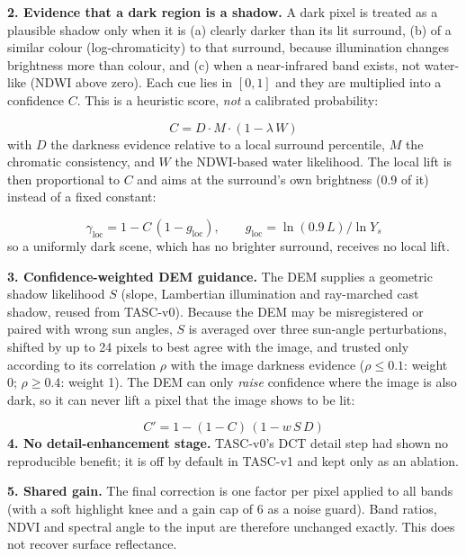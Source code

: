 \documentclass[conference]{IEEEtran}
\begin{document}
\textbf{2. Evidence that a dark region is a shadow.} A dark pixel is treated as a plausible shadow only when it is (a) clearly darker than its lit surround, (b) of a similar colour (log-chromaticity) to that surround, because illumination changes brightness more than colour, and (c) when a near-infrared band exists, not water-like (NDWI above zero). Each cue lies in $[0,1]$ and they are multiplied into a confidence $C$. This is a heuristic score, \emph{not} a calibrated probability:

\begin{equation}
C = D \cdot M \cdot (1 - \lambda\, W)
\end{equation}
with $D$ the darkness evidence relative to a local surround percentile, $M$ the chromatic consistency, and $W$ the NDWI-based water likelihood. The local lift is then proportional to $C$ and aims at the surround's own brightness (0.9 of it) instead of a fixed constant:

\begin{equation}
\gamma_{\mathrm{loc}} = 1 - C\,(1 - g_{\mathrm{loc}}), \qquad g_{\mathrm{loc}} = \ln(0.9\,L)/\ln Y_s
\end{equation}
so a uniformly dark scene, which has no brighter surround, receives no local lift.

\textbf{3. Confidence-weighted DEM guidance.} The DEM supplies a geometric shadow likelihood $S$ (slope, Lambertian illumination and ray-marched cast shadow, reused from TASC-v0). Because the DEM may be misregistered or paired with wrong sun angles, $S$ is averaged over three sun-angle perturbations, shifted by up to 24 pixels to best agree with the image, and trusted only according to its correlation $\rho$ with the image darkness evidence ($\rho \le 0.1$: weight 0; $\rho \ge 0.4$: weight 1). The DEM can only \emph{raise} confidence where the image is also dark, so it can never lift a pixel that the image shows to be lit:

\begin{equation}
C' = 1 - (1 - C)\,(1 - w\,S\,D)
\end{equation}
\textbf{4. No detail-enhancement stage.} TASC-v0's DCT detail step had shown no reproducible benefit; it is off by default in TASC-v1 and kept only as an ablation.

\textbf{5. Shared gain.} The final correction is one factor per pixel applied to all bands (with a soft highlight knee and a gain cap of 6 as a noise guard). Band ratios, NDVI and spectral angle to the input are therefore unchanged exactly. This does not recover surface reflectance.
\end{document}
